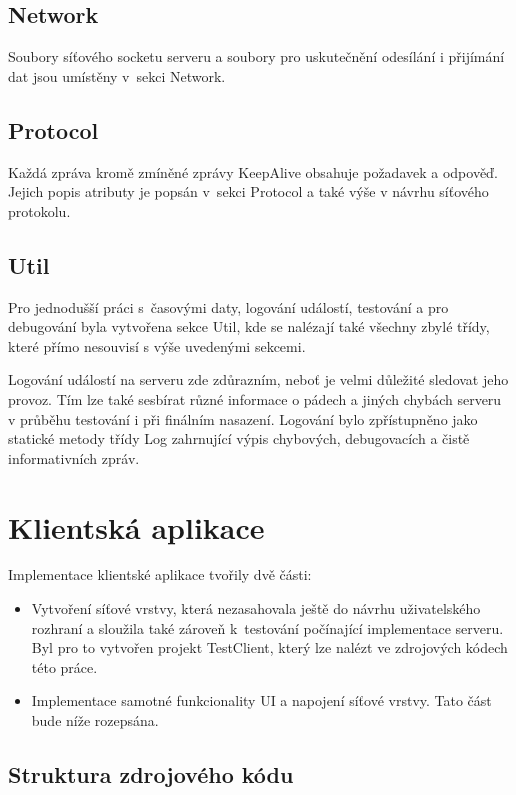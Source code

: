 \documentclass[thesis=B,czech]{FITthesis}[2013/10/20]
\begin{document}
\subsection{Network}
Soubory síťového socketu serveru a soubory pro uskutečnění odesílání i přijímání dat jsou umístěny v~sekci Network. 

\subsection{Protocol}
Každá zpráva kromě zmíněné zprávy KeepAlive obsahuje požadavek a odpověď. Jejich popis atributy je popsán v~sekci Protocol a také výše v návrhu síťového protokolu.

\subsection{Util}
Pro jednodušší práci s~časovými daty, logování událostí, testování a pro debugování byla vytvořena sekce Util, kde se nalézají také všechny zbylé třídy, které přímo nesouvisí s výše uvedenými sekcemi.

Logování událostí na serveru zde zdůrazním, neboť je velmi důležité sledovat jeho provoz. Tím lze také sesbírat různé informace o pádech a jiných chybách serveru v průběhu testování i při finálním nasazení. Logování bylo zpřístupněno jako statické metody třídy Log zahrnující výpis chybových, debugovacích a čistě informativních zpráv.

\section{Klientská aplikace}

Implementace klientské aplikace tvořily dvě části:

\begin{itemize}
	\item{Vytvoření síťové vrstvy, která nezasahovala ještě do návrhu uživatelského rozhraní a sloužila také zároveň k~testování počínající implementace serveru. Byl pro to vytvořen projekt TestClient, který lze nalézt ve zdrojových kódech této práce.}
	\item{Implementace samotné funkcionality UI a napojení síťové vrstvy. Tato část bude níže rozepsána.}
\end{itemize}

\subsection{Struktura zdrojového kódu}
\end{document}
